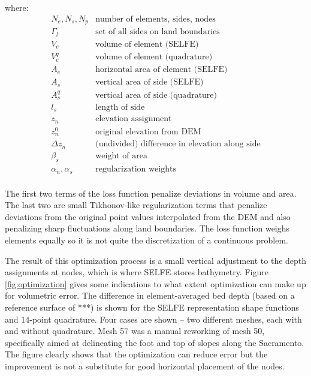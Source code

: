 where:
\begin{align*}
&N_e, N_s, N_p  &\text{number of elements, sides, nodes} &\\
&\Gamma_{l}  &\text{set of all sides on land boundaries} &\\
&V_e            &\text{volume of element (SELFE)} &\\
&V_e^q          &\text{volume of element (quadrature)} &\\
&A_e            &\text{horizontal area of element (SELFE)} &\\
&A_s            &\text{vertical area of side (SELFE)} &\\
&A_s^q          &\text{vertical area of side (quadrature)} &\\
&l_s            &\text{length of side} &\\
&z_n            &\text{elevation assignment} &\\
&z_{n}^{0}    &\text{original elevation from DEM } &\\
&\Delta z_n     &\text{(undivided) difference in elevation along side}  &\\
&\beta_s        &\text{weight of area}  &\\
&\alpha_n, \alpha_s  &\text{regularization weights} \\&
\end{align*}

The first two terms of the loss function penalize deviations in volume and area. The last two are
small Tikhonov-like regularization terms that penalize deviations from
the original point values interpolated from the DEM and also penalizing sharp fluctuations 
along land boundaries. The loss function weighs elements equally so it is 
not quite the discretization of a continuous problem.

The result of this optimization process is a small vertical adjustment to the depth assignments at nodes, which is where SELFE
stores bathymetry. Figure \ref{fig:optimization} gives some indications to what extent optimization can make up for volumetric error. The difference in element-averaged bed depth (based on a reference surface of ***) 
is shown for the SELFE representation shape functions and 14-point quadrature. 
Four cases are shown -- two different meshes, each with and without quadrature. 
Mesh 57 was a manual reworking of mesh 50,  specifically aimed at delineating the foot and top of slopes along the Sacramento.  
The figure clearly shows that the optimization can reduce error but the improvement is not a substitute for good horizontal placement of the nodes.
 
